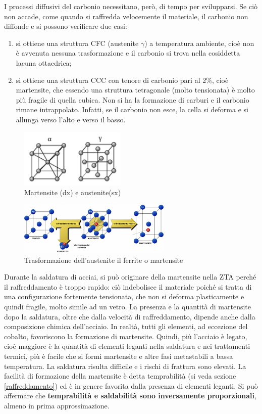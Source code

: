 I processi diffusivi del carbonio necessitano, però, di tempo per svilupparsi. Se ciò non accade, come quando si raffredda velocemente il materiale, il carbonio non diffonde e si possono verificare due casi:
\begin{enumerate}
    \item si ottiene una struttura CFC (austenite $\gamma$) a temperatura ambiente, cioè non è avvenuta nessuna trasformazione e il carbonio si trova nella cosiddetta lacuna ottaedrica;
    \item si ottiene una struttura CCC con tenore di carbonio pari al 2\%, cioè martensite, che essendo una struttura tetragonale (molto tensionata) è molto più fragile di quella cubica. Non si ha la formazione di carburi e il carbonio rimane intrappolato. Infatti, se il carbonio non esce, la cella si deforma e si allunga verso l’alto e verso il basso.
\end{enumerate}
\begin{figure}[!hbt]
    \includegraphics[width=0.45\textwidth]{images/img7.png} 
    \caption{Martensite (dx) e austenite(sx)}
\end{figure}
\begin{figure}[!hbt]
    \includegraphics[width=0.65\textwidth]{images/img8.png} 
    \caption{Trasformazione dell'austenite il ferrite o martensite}
\end{figure}

Durante la saldatura di acciai, si può originare della martensite nella ZTA perché il raffreddamento è troppo rapido: ciò indebolisce il materiale poiché si tratta di una configurazione fortemente tensionata, che non si deforma plasticamente e quindi fragile, molto simile ad un vetro.
La presenza e la quantità di martensite dopo la saldatura, oltre che dalla velocità di raffreddamento, dipende anche dalla composizione chimica dell’acciaio. In realtà, tutti gli elementi, ad eccezione del cobalto, favoriscono la formazione di martensite. Quindi, più l’acciaio è legato, cioè maggiore è la quantità di elementi leganti nella saldatura e nei trattamenti termici, più è facile che si formi martensite e altre fasi metastabili a bassa temperatura. La saldatura risulta difficile e i rischi di frattura sono elevati. La facilità di formazione della martensite è detta temprabilità (si veda sezione \ref{raffreddamento}) ed è in genere favorita dalla presenza di elementi leganti. Si può affermare che \textbf{temprabilità e saldabilità sono inversamente proporzionali}, almeno in prima approssimazione.

